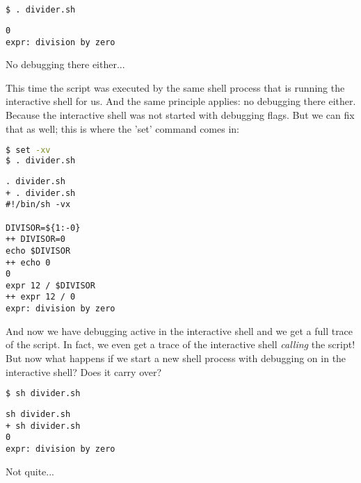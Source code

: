 \lstset{basicstyle=\scriptsize, numbers=left, captionpos=b, tabsize=4}
\begin{lstlisting}[caption=Running the script again,language={bash},
breaklines=true,xleftmargin=15pt,label=lst:Running the script again]
$ . divider.sh
\end{lstlisting}

\scriptsize
\begin{verbatim}
0
expr: division by zero
\end{verbatim}
\normalsize
No debugging there either...

This time the script was executed by the same shell process that is running the
interactive shell for us. And the same principle applies: no debugging there
either. Because the interactive shell was not started with debugging flags. But
we can fix that as well; this is where the 'set' command comes in:

\lstset{basicstyle=\scriptsize, numbers=left, captionpos=b, tabsize=4}
\begin{lstlisting}[caption=Running the script again,language={bash},
breaklines=true,xleftmargin=15pt,label=lst:Running the script again]
$ set -xv
$ . divider.sh
\end{lstlisting}

\scriptsize
\begin{verbatim}
. divider.sh
+ . divider.sh
#!/bin/sh -vx

DIVISOR=${1:-0}
++ DIVISOR=0
echo $DIVISOR
++ echo 0
0
expr 12 / $DIVISOR
++ expr 12 / 0
expr: division by zero
\end{verbatim}
\normalsize

And now we have debugging active in the interactive shell and we get a full
trace of the script. In fact, we even get a trace of the interactive shell
\emph{calling} the script! But now what happens if we start a new shell process
with debugging on in the interactive shell? Does it carry over?

\lstset{basicstyle=\scriptsize, numbers=left, captionpos=b, tabsize=4}
\begin{lstlisting}[caption=Running the script again,language={bash},
breaklines=true,xleftmargin=15pt,label=lst:Running the script again]
$ sh divider.sh
\end{lstlisting}

\scriptsize
\begin{verbatim}
sh divider.sh
+ sh divider.sh
0
expr: division by zero
\end{verbatim}
\normalsize
Not quite...

